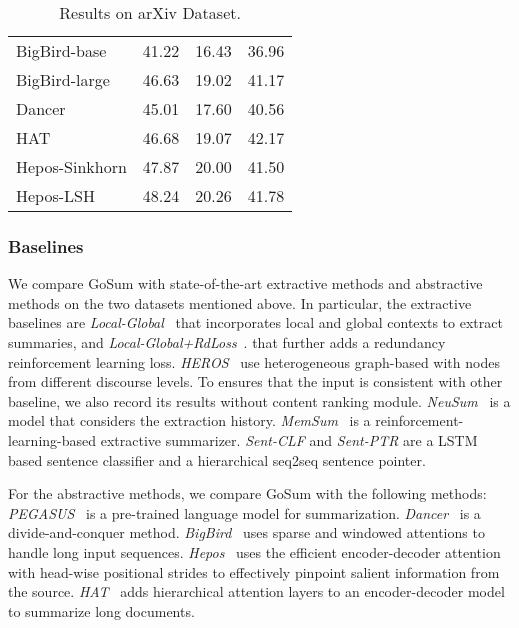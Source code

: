 \begin{table}[t]
\begin{tabular}{p{36mm}|p{8mm}p{8mm}p{8mm}}
          BigBird-base                  & 41.22 & 16.43 & 36.96  \\
          BigBird-large                 & 46.63 & 19.02 & 41.17  \\
          Dancer                        & 45.01 & 17.60 & 40.56  \\
          HAT                           & 46.68 & 19.07 & 42.17  \\
          Hepos-Sinkhorn                & 47.87 & 20.00 & 41.50  \\
          Hepos-LSH                     & 48.24 & 20.26 & 41.78  \\
          \bottomrule
  \end{tabular}
  \caption{Results on arXiv Dataset.} \label{tab:sota_arxiv}
\end{table}

\subsubsection{Baselines}
We compare GoSum with state-of-the-art extractive methods and abstractive methods on the two datasets mentioned above.
In particular, the extractive baselines are \textit{Local-Global}~  that incorporates local and global contexts to extract summaries, and \textit{Local-Global+RdLoss}~. 
that further adds a redundancy reinforcement learning loss. 
\textit{HEROS}~\cite{discourse_2021} use heterogeneous graph-based with nodes from different discourse levels.
To ensures that the input is consistent with other baseline, we also record its results without content ranking module. 
\textit{NeuSum}~ is a model that considers the extraction history. 
\textit{MemSum}~ is a reinforcement-learning-based extractive summarizer.
\textit{Sent-CLF} and \textit{Sent-PTR} \cite{clfptr_2020} are a LSTM based sentence classifier and a hierarchical seq2seq sentence pointer.

For the abstractive methods, we compare GoSum with the following methods:
\textit{PEGASUS}~\cite{pegasus_2020} is a pre-trained language model for summarization.
\textit{Dancer}~\cite{dancer_2020} is a divide-and-conquer method.
\textit{BigBird}~ uses sparse and windowed attentions to handle long input sequences.
\textit{Hepos}~\cite{hepo_2021} uses the efficient encoder-decoder attention with head-wise positional strides to effectively pinpoint salient information from the source.
\textit{HAT}~\cite{hat_2021} adds hierarchical attention layers to an encoder-decoder model to summarize long documents.

